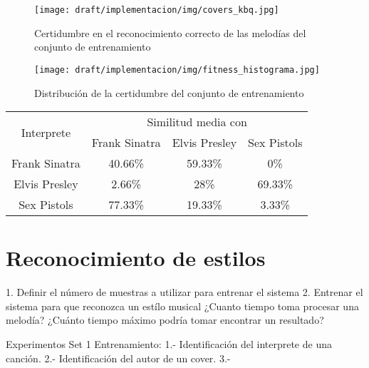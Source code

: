 \begin{figure}[h]
    \texttt{[image: draft/implementacion/img/covers\_kbq.jpg]}
    \caption{Certidumbre en el reconocimiento correcto de las melodías del conjunto de entrenamiento}
\end{figure}

\begin{figure}[h]
    \texttt{[image: draft/implementacion/img/fitness\_histograma.jpg]}
    \caption{Distribución de la certidumbre del conjunto de entrenamiento}
\end{figure}

\begin{center}
    \begin{tabular}{| c | c | c | c |}
        \hline
        \multirow{2}{*}{Interprete} & \multicolumn{3}{|c|}{Similitud media con} \\
         & Frank Sinatra & Elvis Presley & Sex Pistols \\ \hline
        Frank Sinatra & 40.66\% & 59.33\% & 0\% \\
        Elvis Presley & 2.66\% & 28\% & 69.33\% \\
        Sex Pistols & 77.33\% & 19.33\% & 3.33\% \\
        \hline
    \end{tabular}
\end{center}

\section{Reconocimiento de estilos}
  1. Definir el número de muestras a utilizar para entrenar el sistema
  2. Entrenar el sistema para que reconozca un estílo musical
    ¿Cuanto tiempo toma procesar una melodía?
    ¿Cuánto tiempo máximo podría tomar encontrar un resultado?

  Experimentos Set 1 Entrenamiento:
    1.- Identificación del interprete de una canción.
    2.- Identificación del autor de un cover.
    3.-
